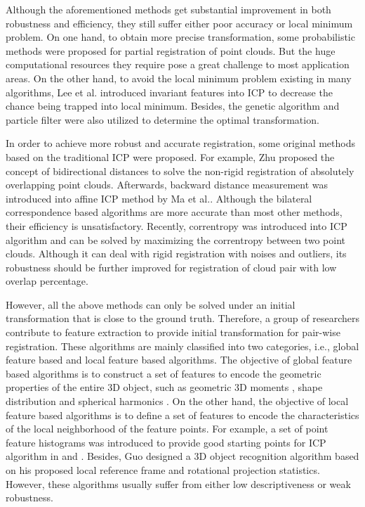 \documentclass[review]{elsarticle}
\begin{document}
Although the aforementioned methods get substantial improvement in both robustness and efficiency, they still suffer either poor accuracy or local minimum problem. On one hand, to obtain more precise transformation, some probabilistic methods \cite{Granger02,Jian11,Myronenko10,Tsin04} were proposed for partial registration of point clouds. But the huge computational resources they require pose a great challenge to most application areas. On the other hand, to avoid the local minimum problem existing in many algorithms, Lee et al. \cite{Lee02} introduced invariant features into ICP to decrease the chance being trapped into local minimum. Besides, the genetic algorithm \cite{Lomonosov06, Zhu14} and particle filter \cite{Sandhu13} were also utilized to determine the optimal transformation.

In order to achieve more robust and accurate registration, some original methods based on the traditional ICP were proposed. For example, Zhu \cite{Zhu12} proposed the concept of bidirectional distances to solve the non-rigid registration of absolutely overlapping point clouds. Afterwards, backward distance measurement was introduced into affine ICP method by Ma et al.\cite{Ma13}. Although the bilateral correspondence based algorithms are more accurate than most other methods, their efficiency is unsatisfactory. Recently, correntropy \cite{Hasanbelliu14,Xu16} was introduced into ICP algorithm and can be solved by maximizing the correntropy between two point clouds. Although it can deal with rigid registration with noises and outliers, its robustness should be further improved for registration of cloud pair with low overlap percentage.

However, all the above methods can only be solved under an initial transformation that is close to the ground truth. Therefore, a group of researchers contribute to feature extraction to provide initial transformation for pair-wise registration. These algorithms are mainly classified into two categories, i.e., global feature based and local feature based algorithms. The objective of global feature based algorithms is to construct a set of features to encode the geometric properties of the entire 3D object, such as geometric 3D moments \cite{Paquet00}, shape distribution \cite{Osada02} and spherical harmonics \cite{Funkhouser03}. On the other hand, the objective of local feature based algorithms is to define a set of features to encode the characteristics of the local neighborhood of the feature points. For example, a set of point feature histograms was introduced to provide good starting points for ICP algorithm in \cite{Rusu08} and \cite{Rusu09}. Besides, Guo \cite{Guo13} designed a 3D object recognition algorithm based on his proposed local reference frame and rotational projection statistics. However, these algorithms usually suffer from either low descriptiveness or weak robustness.
\end{document}
